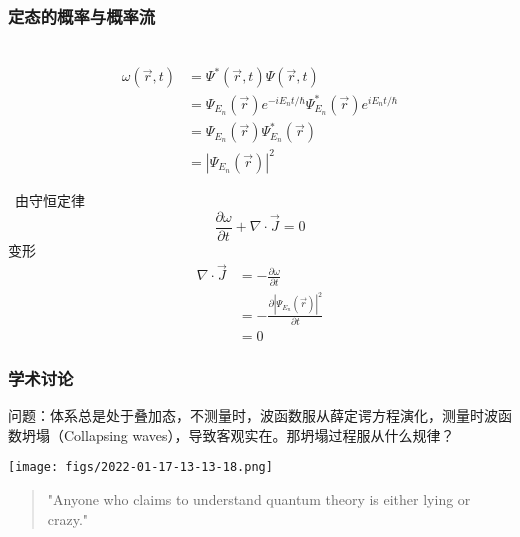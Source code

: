 \begin{frame} 
    \frametitle{定态的概率与概率流}
    \例[1.试证明定态的概率密度不随时间变化]{}
    \证~
    \begin{equation*}
        \begin{split}
            \omega (\vec{r}, t)&=\Psi^{*}(\vec{r}, t) \Psi(\vec{r}, t) \\
            &=\Psi_{E_n} (\vec{r} ) e^{-iE_n t/\hbar} \Psi_{E_n} ^* (\vec{r} ) e^{iE_n t/\hbar} \\
            &=\Psi_{E_n} (\vec{r} )\Psi_{E_n} ^* (\vec{r} ) \\
            &=|\Psi_{E_n} (\vec{r} )|^2
        \end{split}
    \end{equation*}
\end{frame}

\begin{frame}   
    \例[2.试证明定态的概率流密度与时间无关]{} 
    \证~由守恒定律 
    \begin{equation*}
        \frac{\partial \omega}{\partial t }+ \nabla \cdot \vec{J}=0
    \end{equation*}  
    变形
    \begin{equation*}
        \begin{aligned}
            \nabla \cdot \vec{J} &=-\frac{\partial \omega}{\partial t}\\
            &= -\frac{\partial |\Psi_{E_n} (\vec{r} )|^2}{\partial t}\\
            &=0 
        \end{aligned}
    \end{equation*}  
\end{frame}

\begin{frame}
    \frametitle{学术讨论}
    问题：体系总是处于叠加态，不测量时，波函数服从薛定谔方程演化，测量时波函数坍塌（Collapsing waves），导致客观实在。那坍塌过程服从什么规律？\\
    \begin{center}
        \texttt{[image: figs/2022-01-17-13-13-18.png]} \\
    \end{center} 
    \begin{quote}
    "Anyone who claims to understand quantum theory is either lying or crazy." \\
    \end{quote}
\end{frame}

